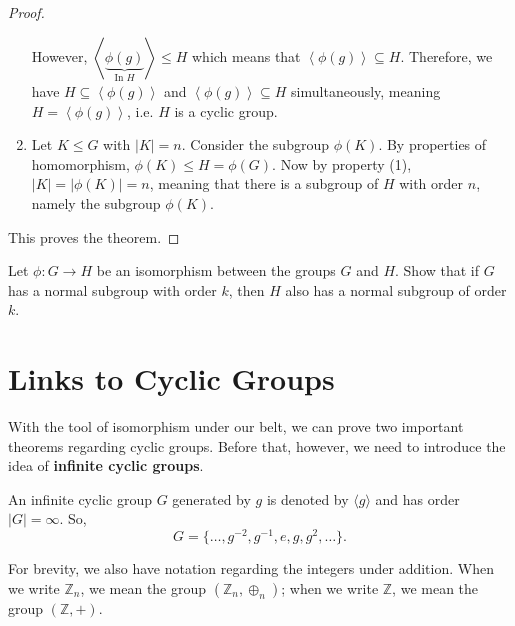 \begin{proof}
\begin{enumerate}
        However, $\left\langle \underbrace{\phi(g)}_{\text{In }H} \right\rangle \leq H$ which means that $\left\langle \phi(g) \right\rangle \subseteq H$. Therefore, we have $H \subseteq \left\langle \phi(g) \right\rangle$ and $\left\langle \phi(g) \right\rangle \subseteq H$ simultaneously, meaning $H = \left\langle \phi(g) \right\rangle$, i.e. $H$ is a cyclic group.

        \item Let $K \leq G$ with $|K| = n$. Consider the subgroup $\phi(K)$. By properties of homomorphism, $\phi(K) \leq H = \phi(G)$. Now by property (1), $|K| = |\phi(K)| = n$, meaning that there is a subgroup of $H$ with order $n$, namely the subgroup $\phi(K)$.
    \end{enumerate}

    This proves the theorem.
\end{proof}

\begin{exercise}
    Let $\phi: G \to H$ be an isomorphism between the groups $G$ and $H$. Show that if $G$ has a normal subgroup with order $k$, then $H$ also has a normal subgroup of order $k$.
\end{exercise}

\section{Links to Cyclic Groups}
With the tool of isomorphism under our belt, we can prove two important theorems regarding cyclic groups. Before that, however, we need to introduce the idea of \textbf{infinite cyclic groups}.
\begin{definition}
    An infinite cyclic group $G$ generated by $g$ is denoted by $\langle g \rangle$ and has order $|G| = \infty$. So,
    \[
        G = \{\dots, g^{-2}, g^{-1}, e, g, g^2, \dots\}.
    \]
\end{definition}

For brevity, we also have notation regarding the integers under addition. When we write $\mathbb{Z}_n$, we mean the group $(\mathbb{Z}_n, \oplus_n)$; when we write $\mathbb{Z}$, we mean the group $(\mathbb{Z}, +)$.

\newpage

